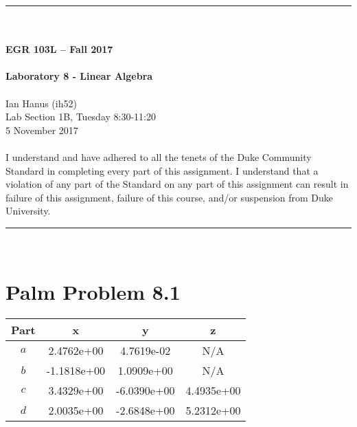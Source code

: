 \documentclass{article}
\begin{document}
\begin{center}
\rule{6.5in}{0.5mm}\\~\\
\textbf{\large EGR 103L -- Fall 2017}\\~\\
\textbf{\huge Laboratory 8 - Linear Algebra}\\~\\
Ian Hanus (ih52)\\
Lab Section 1B, Tuesday 8:30-11:20\\
5 November 2017\\~\\
{\small I understand and have adhered to all the tenets of the Duke
  Community Standard in completing every part of this assignment.  I
  understand that a violation of any part of the Standard on any part
  of this assignment can result in failure of this assignment, failure
  of this course, and/or suspension from Duke University.} 
\rule{6.5in}{0.5mm}\\
\end{center}
\tableofcontents
\listoffigures
\pagebreak
\section{Palm Problem 8.1}
\renewcommand{\arraystretch}{1.5}
\begin{center}
\begin{tabular}{|c||c|c|c|}\hline
Part & x & y & z \\ \hline \hline
$a$ & 2.4762e+00 & 4.7619e-02  & N/A\\ \hline
$b$ & -1.1818e+00  & 1.0909e+00  & N/A \\ \hline
$c$ & 3.4329e+00 & -6.0390e+00  & 4.4935e+00 \\ \hline
$d$ & 2.0035e+00 & -2.6848e+00 & 5.2312e+00 \\ \hline
\end{tabular}
\end{center}
\end{document}
